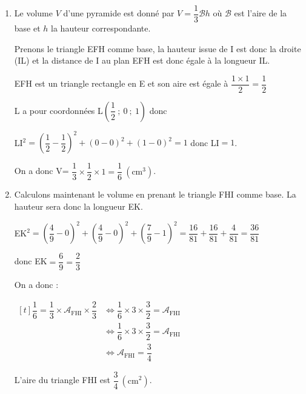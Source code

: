\begin{enumerate}
\begin{enumerate}
Le seul point de la droite étant aussi sur le plan est donc K, c'est le point de paramètre $\dfrac{4}{9}$ dans l'équation paramétrique de $(\mathrm{EJ})$.

		Ses coordonnées vérifient :

		$x_\mathrm{K}=\dfrac{4}{9}$, \quad $y_\mathrm{K}=\dfrac{4}{9}$ \quad et \quad $z_\mathrm{K}=1- \dfrac{1}{2} \times \dfrac{4}{9}=1-\dfrac{2}{9}=\dfrac{7}{9}$.

		Le projeté orthogonal  du point E sur le plan (FHI) est le point K de coordonnées K$\left( \dfrac{4}{9} ~;~  \dfrac{4}{9} ~;~ \dfrac{7}{9} \right)$.


		\item  Le volume $V$ d'une pyramide est donné par  $V=\dfrac{1}{3}\mathcal{B}h$  où  $\mathcal{B}$ est l'aire de la base et $h$ la hauteur correspondante.

		Prenons le triangle EFH comme base, la hauteur issue de  I est donc la droite (IL) et la distance de I au plan EFH est donc égale à la longueur IL.

		EFH est un triangle rectangle en E et son aire est égale à $\dfrac{ 1\times 1}{2}=\dfrac{1}{2}$

		L a pour coordonnées  L$\left(\dfrac{1}{2}~;~ 0~;~1 \right)$   donc

		LI$^2= \left( \dfrac{1}{2} -\dfrac{1}{2}   \right)^2 + (0-0)^2 + (1-0)^2= 1 $ donc LI$=1$.

		On a donc V= $\dfrac{1}{3} \times \dfrac{1}{2} \times 1 = \dfrac{1}{6}~\left(\text{cm}^3\right)$.


		\item  Calculons maintenant le volume en prenant le triangle FHI comme base. La hauteur sera donc la longueur EK.

		EK$^2=    \left( \dfrac{4}{9} -0   \right)^2 + \left( \dfrac{4}{9} -0  \right)^2 + \left( \dfrac{7}{9} -1  \right)^2  = \dfrac{16}{81}+ \dfrac{16}{81}+\dfrac{4}{81}  = \dfrac{36}{81}$

		donc EK$=\dfrac{6}{9}=\dfrac{2}{3}$

		On a donc :

		$\begin{aligned}[t] \dfrac{1}{6}=\dfrac{1}{3}\times \mathcal{A}_{\mathrm{FHI}}\times \dfrac{2}{3}
		&\iff \dfrac{1}{6} \times 3 \times\dfrac{3}{2} =  \mathcal{A}_{\mathrm{FHI}} \\
		&\iff \dfrac{1}{6} \times 3 \times\dfrac{3}{2} =  \mathcal{A}_{\mathrm{FHI}} \\
		&\iff  \mathcal{A}_{\mathrm{FHI}}=\dfrac{3}{4}\end{aligned}$


		L'aire du triangle FHI est	$ \dfrac{3}{4}~\left(\text{cm}^2\right)$.
	\end{enumerate}
\end{enumerate}

\bigskip
